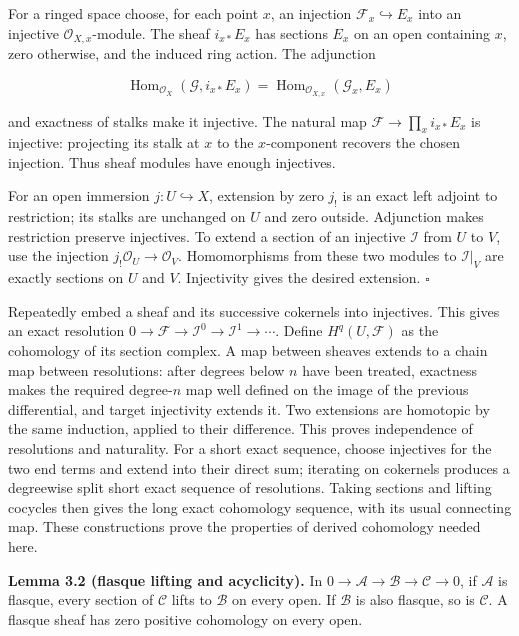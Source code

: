 \documentclass[11pt,a4paper,openany]{report}
\begin{document}
For a ringed space choose, for each point \(x\), an injection \(\mathcal F_x\hookrightarrow E_x\) into an injective \(\mathcal O_{X,x}\)-module. The sheaf \(i_{x*}E_x\) has sections \(E_x\) on an open containing \(x\), zero otherwise, and the induced ring action. The adjunction

\[
\operatorname{Hom}_{\mathcal O_X}(\mathcal G,i_{x*}E_x)
=\operatorname{Hom}_{\mathcal O_{X,x}}(\mathcal G_x,E_x)
\]

and exactness of stalks make it injective. The natural map \(\mathcal F\to\prod_xi_{x*}E_x\) is injective: projecting its stalk at \(x\) to the \(x\)-component recovers the chosen injection. Thus sheaf modules have enough injectives.

For an open immersion \(j:U\hookrightarrow X\), extension by zero \(j_!\) is an exact left adjoint to restriction; its stalks are unchanged on \(U\) and zero outside. Adjunction makes restriction preserve injectives. To extend a section of an injective \(\mathcal I\) from \(U\) to \(V\), use the injection \(j_!\mathcal O_U\to\mathcal O_V\). Homomorphisms from these two modules to \(\mathcal I|_V\) are exactly sections on \(U\) and \(V\). Injectivity gives the desired extension. \(\square\)

Repeatedly embed a sheaf and its successive cokernels into injectives. This gives an exact resolution \(0\to\mathcal F\to\mathcal I^0\to\mathcal I^1\to\cdots\). Define \(H^q(U,\mathcal F)\) as the cohomology of its section complex. A map between sheaves extends to a chain map between resolutions: after degrees below \(n\) have been treated, exactness makes the required degree-\(n\) map well defined on the image of the previous differential, and target injectivity extends it. Two extensions are homotopic by the same induction, applied to their difference. This proves independence of resolutions and naturality. For a short exact sequence, choose injectives for the two end terms and extend into their direct sum; iterating on cokernels produces a degreewise split short exact sequence of resolutions. Taking sections and lifting cocycles then gives the long exact cohomology sequence, with its usual connecting map. These constructions prove the properties of derived cohomology needed here.

\textbf{Lemma 3.2 (flasque lifting and acyclicity).} In \(0\to\mathcal A\to\mathcal B\to\mathcal C\to0\), if \(\mathcal A\) is flasque, every section of \(\mathcal C\) lifts to \(\mathcal B\) on every open. If \(\mathcal B\) is also flasque, so is \(\mathcal C\). A flasque sheaf has zero positive cohomology on every open.
\end{document}
